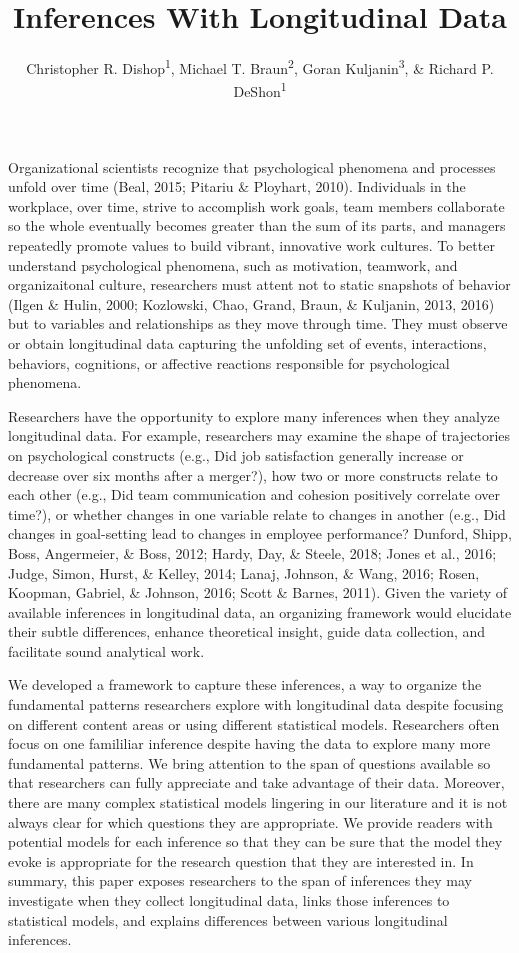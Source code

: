 \documentclass[english,,man]{apa6}
\title{Inferences With Longitudinal Data}
\author{Christopher R. Dishop\textsuperscript{1}, Michael T.
Braun\textsuperscript{2}, Goran Kuljanin\textsuperscript{3}, \& Richard
P. DeShon\textsuperscript{1}}
\date{}
\affiliation{
\vspace{0.5cm}
\textsuperscript{1} Michigan State University\\\textsuperscript{2} University of South Florida\\\textsuperscript{3} DePaul University}
\theoremstyle{definition}
\theoremstyle{definition}
\theoremstyle{definition}
\theoremstyle{remark}
\begin{document}
\maketitle

Organizational scientists recognize that psychological phenomena and
processes unfold over time (Beal, 2015; Pitariu \& Ployhart, 2010).
Individuals in the workplace, over time, strive to accomplish work
goals, team members collaborate so the whole eventually becomes greater
than the sum of its parts, and managers repeatedly promote values to
build vibrant, innovative work cultures. To better understand
psychological phenomena, such as motivation, teamwork, and
organizaitonal culture, researchers must attent not to static snapshots
of behavior (Ilgen \& Hulin, 2000; Kozlowski, Chao, Grand, Braun, \&
Kuljanin, 2013, 2016) but to variables and relationships as they move
through time. They must observe or obtain longitudinal data capturing
the unfolding set of events, interactions, behaviors, cognitions, or
affective reactions responsible for psychological phenomena.

Researchers have the opportunity to explore many inferences when they
analyze longitudinal data. For example, researchers may examine the
shape of trajectories on psychological constructs (e.g., Did job
satisfaction generally increase or decrease over six months after a
merger?), how two or more constructs relate to each other (e.g., Did
team communication and cohesion positively correlate over time?), or
whether changes in one variable relate to changes in another (e.g., Did
changes in goal-setting lead to changes in employee performance?
Dunford, Shipp, Boss, Angermeier, \& Boss, 2012; Hardy, Day, \& Steele,
2018; Jones et al., 2016; Judge, Simon, Hurst, \& Kelley, 2014; Lanaj,
Johnson, \& Wang, 2016; Rosen, Koopman, Gabriel, \& Johnson, 2016; Scott
\& Barnes, 2011). Given the variety of available inferences in
longitudinal data, an organizing framework would elucidate their subtle
differences, enhance theoretical insight, guide data collection, and
facilitate sound analytical work.

We developed a framework to capture these inferences, a way to organize
the fundamental patterns researchers explore with longitudinal data
despite focusing on different content areas or using different
statistical models. Researchers often focus on one famililiar inference
despite having the data to explore many more fundamental patterns. We
bring attention to the span of questions available so that researchers
can fully appreciate and take advantage of their data. Moreover, there
are many complex statistical models lingering in our literature and it
is not always clear for which questions they are appropriate. We provide
readers with potential models for each inference so that they can be
sure that the model they evoke is appropriate for the research question
that they are interested in. In summary, this paper exposes researchers
to the span of inferences they may investigate when they collect
longitudinal data, links those inferences to statistical models, and
explains differences between various longitudinal inferences.
\end{document}
